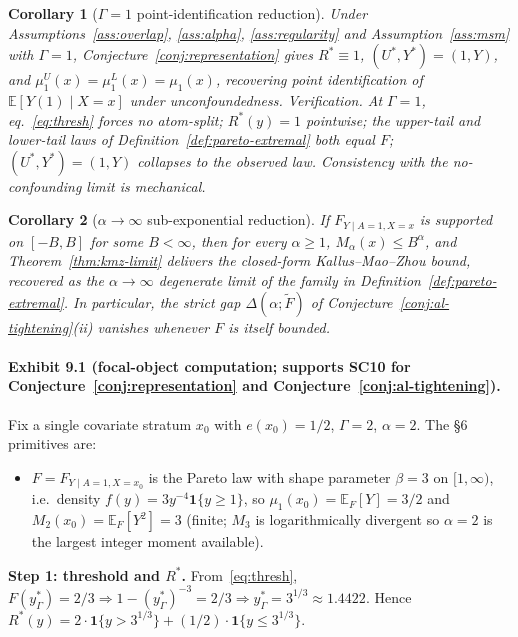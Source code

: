 \documentclass[11pt]{article}
\newcommand{\E}{\mathbb{E}}
\theoremstyle{definition}
\theoremstyle{plain}
\newtheorem{corollary}{Corollary}
\theoremstyle{remark}
\begin{document}
\begin{corollary}[$\Gamma = 1$ point-identification reduction]\label{cor:point-id}
Under Assumptions~\ref{ass:overlap}, \ref{ass:alpha}, \ref{ass:regularity} and Assumption~\ref{ass:msm} with $\Gamma = 1$, Conjecture~\ref{conj:representation} gives $R^* \equiv 1$, $(U^*, Y^*) = (1, Y)$, and $\mu_1^U(x) = \mu_1^L(x) = \mu_1(x)$, recovering point identification of $\E[Y(1) \mid X = x]$ under unconfoundedness.
\emph{Verification.} At $\Gamma = 1$, eq.~\eqref{eq:thresh} forces no atom-split; $R^*(y) = 1$ pointwise; the upper-tail and lower-tail laws of Definition~\ref{def:pareto-extremal} both equal $F$; $(U^*, Y^*) = (1, Y)$ collapses to the observed law. Consistency with the no-confounding limit is mechanical.
\end{corollary}

\begin{corollary}[$\alpha \to \infty$ sub-exponential reduction]\label{cor:alpha-inf}
If $F_{Y \mid A=1, X=x}$ is supported on $[-B, B]$ for some $B < \infty$, then for every $\alpha \ge 1$, $M_\alpha(x) \le B^\alpha$, and Theorem~\ref{thm:kmz-limit} delivers the closed-form Kallus--Mao--Zhou bound, recovered as the $\alpha \to \infty$ degenerate limit of the family in Definition~\ref{def:pareto-extremal}. In particular, the strict gap $\Delta(\alpha; \tilde F)$ of Conjecture~\ref{conj:al-tightening}(ii) vanishes whenever $F$ is itself bounded.
\end{corollary}

\paragraph{Exhibit 9.1 (focal-object computation; supports SC10 for Conjecture~\ref{conj:representation} and Conjecture~\ref{conj:al-tightening}).}
Fix a single covariate stratum $x_0$ with $e(x_0) = 1/2$, $\Gamma = 2$, $\alpha = 2$. The \S6 primitives are:
\begin{itemize}[leftmargin=*]
  \item $F = F_{Y \mid A=1, X = x_0}$ is the Pareto law with shape parameter $\beta = 3$ on $[1, \infty)$, i.e.\ density $f(y) = 3 y^{-4} \mathbf{1}\{y \ge 1\}$, so $\mu_1(x_0) = \E_F[Y] = 3/2$ and $M_2(x_0) = \E_F[Y^2] = 3$ (finite; $M_3$ is logarithmically divergent so $\alpha = 2$ is the largest integer moment available).
\end{itemize}
\textbf{Step 1: threshold and $R^*$.} From~\eqref{eq:thresh}, $F(y_\Gamma^*) = 2/3 \Rightarrow 1 - (y_\Gamma^*)^{-3} = 2/3 \Rightarrow y_\Gamma^* = 3^{1/3} \approx 1.4422$. Hence $R^*(y) = 2 \cdot \mathbf{1}\{y > 3^{1/3}\} + (1/2) \cdot \mathbf{1}\{y \le 3^{1/3}\}$.
\end{document}
